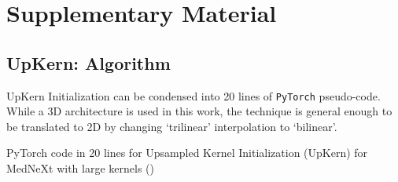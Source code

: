 \documentclass[runningheads]{llncs}
\begin{document}



\newpage
\section{Supplementary Material}

\subsection{UpKern: Algorithm}
UpKern Initialization can be condensed into 20 lines of \texttt{PyTorch} pseudo-code. While a 3D architecture is used in this work, the technique is general enough to be translated to 2D by changing `trilinear' interpolation to `bilinear'.
\begin{algorithm}[H] \small
    \centering
    \caption{PyTorch code in 20 lines for Upsampled Kernel Initialization (UpKern) for MedNeXt with large kernels () }
    \label{alg:cap}
    
    \label{alg:upkern}
\end{algorithm}
\end{document}
